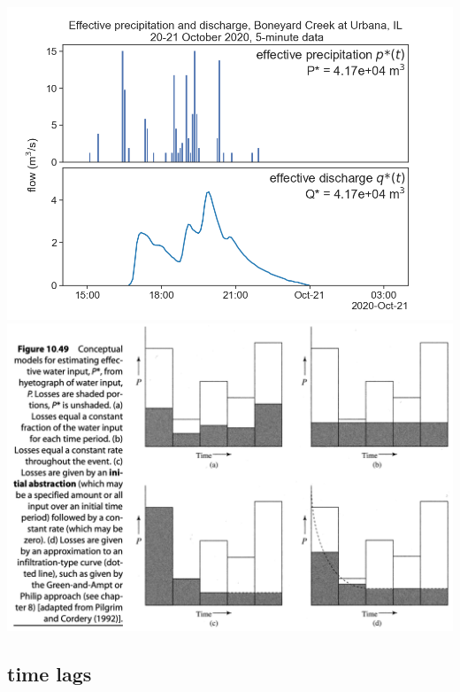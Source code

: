 \documentclass[
  letterpaper,
  DIV=11,
  numbers=noendperiod]{scrreprt}
\begin{document}
\includegraphics{archive/figures/urbana_pstar_qstar.png}
\includegraphics{archive/figures/dingman-figure10.49.png}

\hypertarget{time-lags}{%
\subsection{time lags}\label{time-lags}}
\end{document}
